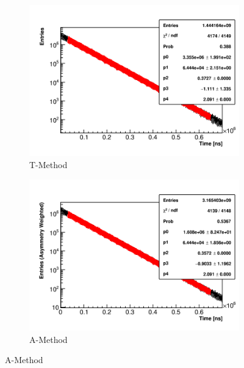 \begin{figure}
\centering
    \begin{subfigure}[t]{0.45\textwidth}
        \centering
        \includegraphics[width=\textwidth]{Example_TMethod_Fit}
        \caption{T-Method}
    \end{subfigure}
    \hspace{1mm}
    \begin{subfigure}[t]{0.45\textwidth}
        \centering
        \includegraphics[width=\textwidth]{Example_AMethod_Fit}
        \caption{A-Method}
    \end{subfigure}%


\end{figure}
